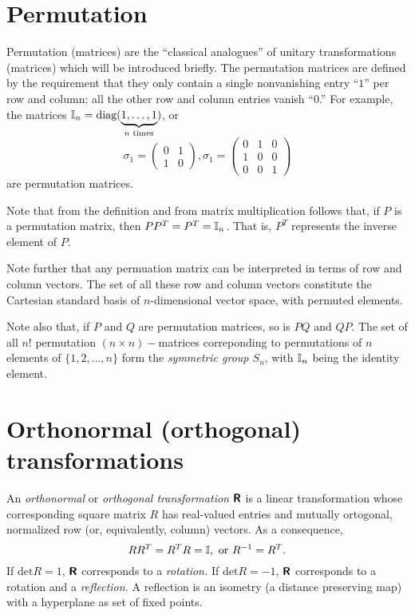 \section{Permutation}

Permutation (matrices) are the ``classical analogues'' \cite{mermin-04,mermin-07}
of unitary transformations (matrices) which will be introduced briefly.
The permutation matrices are defined by the requirement that they only contain a single nonvanishing entry ``$1$'' per row and column;
all the other row and column entries vanish ``$0$.''
For example, the matrices ${\Bbb I}_n=\textrm{diag}(\underbrace{1,\ldots ,1}_{n \textrm{ times}})$,
or
$$
\sigma_1=
\begin{pmatrix}
0&1\\
1&0
\end{pmatrix} ,
\sigma_1=
\begin{pmatrix}
0&1&0\\
1&0&0\\
0&0&1
\end{pmatrix}
$$
are permutation matrices.

Note that from the definition and from matrix multiplication follows that,
if $P$ is a permutation matrix, then $PP^T=P^T={\Bbb I}_n$.
That is, $P^T$ represents the inverse element of $P$.

Note further that any permuation matrix can be interpreted in terms of row and column vectors.
The set of all these row and column vectors constitute the Cartesian standard basis of $n$-dimensional vector space,
with permuted elements.

Note also that, if $P$ and $Q$ are permutation matrices, so is $PQ$ and $QP$.
The set of all $n!$
permutation $(n\times n)-$matrices correponding to permutations of $n$ elements of $\{ 1,2,\ldots ,n\}$ form the
{\em symmetric group $S_n$}, with ${\Bbb I}_n$ being the identity element.


\section{Orthonormal (orthogonal) transformations}

An {\em orthonormal} or {\em orthogonal transformation} $\textsf{\textbf{R}}$ is a linear transformation
whose corresponding square matrix $R$ has real-valued entries
and mutually ortogonal, normalized row (or, equivalently, column) vectors.
As a consequence,
\begin{equation}
RR^T= R^TR= {\Bbb I}, \textrm{ or } R^{-1}=R^T .
\end{equation}
If $\textrm{det} R=1$, $\textsf{\textbf{R}}$ corresponds to a {\em rotation.}
If $\textrm{det} R=-1$, $\textsf{\textbf{R}}$ corresponds to a rotation and a {\em reflection.}
A reflection is an isometry (a distance preserving map) with a hyperplane as set of fixed points.

